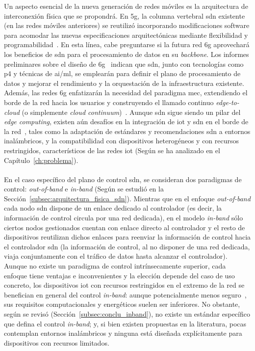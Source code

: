 Un aspecto esencial de la nueva generación de redes móviles es la arquitectura de interconexión física que se propondrá. En \gls{5g}, la columna vertebral \gls{sdn} existente (en las redes móviles anteriores) se reutilizó incorporando modificaciones software para acomodar las nuevas especificaciones arquitectónicas mediante flexibilidad y programabilidad~\cite{Li2018}. En esta línea, cabe preguntarse si la futura red \gls{6g} aprovechará los beneficios de \gls{sdn} para el procesamiento de datos en su \textit{backbone}. Los informes preliminares sobre el diseño de \gls{6g}~\cite{uusitalo20216g,6garch1,6garch2} indican que \gls{sdn}, junto con tecnologías como \gls{p4} y técnicas de \gls{ai}/\gls{ml}, se emplearán para definir el plano de procesamiento de datos y mejorar el rendimiento y la orquestación de la infraestructura existente. Además, las redes \gls{6g} enfatizarán la necesidad del paradigma \gls{mec}, extendiendo el borde de la red hacia los usuarios y construyendo el llamado continuo \textit{edge-to-cloud} (o simplemente \textit{cloud continuum})~\cite{Milojicic20}. Aunque \gls{sdn} sigue siendo un pilar del \textit{edge computing}, existen aún desafíos en la integración de \gls{iot} y \gls{sdn} en el borde de la red~\cite{Bittencourt18}, tales como la adaptación de estándares y recomendaciones \gls{sdn} a entornos inalámbricos, y la compatibilidad con dispositivos heterogéneos y con recursos restringidos, característicos de las redes \gls{iot} (Según se ha analizado en el Capítulo~\ref{ch:problema}).\\
\\
En el caso específico del plano de control \gls{sdn}, se consideran dos paradigmas de control: \textit{out-of-band} e \textit{in-band} (Según se estudió en la Sección~\ref{subsec:arquitectura_fisica_sdn}). Mientras que en el enfoque \textit{out-of-band} cada nodo \gls{sdn} dispone de un enlace dedicado al controlador (es decir, la información de control circula por una red dedicada), en el modelo \textit{in-band} sólo ciertos nodos gestionados cuentan con enlace directo al controlador y el resto de dispositivos reutilizan dichos enlaces para reenviar la información de control hacia el controlador \gls{sdn} (la información de control, al no disponer de una red dedicada, viaja conjuntamente con el tráfico de datos hasta alcanzar el controlador). Aunque no existe un paradigma de control intrínsecamente superior, cada enfoque tiene ventajas e inconvenientes y la elección depende del caso de uso concreto, los dispositivos \gls{iot} con recursos restringidos en el extremo de la red se benefician en general del control \textit{in-band}: aunque potencialmente menos seguro~\cite{feghali2015sdn}, sus requisitos computacionales y energéticos suelen ser inferiores. No obstante, según se revisó (Sección~\ref{subsec:conclu_inband}), no existe un estándar específico que defina el control \textit{in-band}; y, si bien existen propuestas en la literatura, pocas contemplan entornos inalámbricos y ninguna está diseñada explícitamente para dispositivos con recursos limitados.\\
